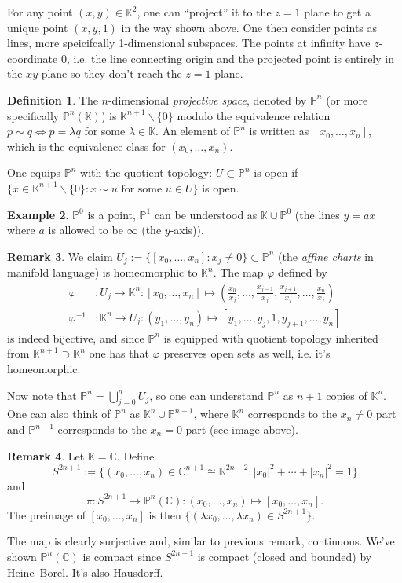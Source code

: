 \documentclass{article}
\newcommand{\R}{\mathbb{R}}
\newcommand{\C}{\mathbb{C}}
\newcommand{\K}{\mathbb{K}}
\newcommand{\p}{\mathbb{P}}
\theoremstyle{definition}
\newtheorem{defn}{Definition}[subsection]
\newtheorem{example}[defn]{Example}
\newtheorem{remark}[defn]{Remark}
\begin{document}
For any point $(x,y)\in\K^2$, one can ``project'' it to the $z=1$ plane to get a unique point $(x,y,1)$ in the way shown above. One then consider points as lines, more speicifcally 1-dimensional subspaces. The points at infinity have $z$-coordinate 0, i.e. the line connecting origin and the projected point is entirely in the $xy$-plane so they don't reach the $z=1$ plane.

\begin{defn}
The $n$-dimensional \textit{projective space}, denoted by $\p^n$ (or more specifically $\p^n(\K)$) is $\K^{n+1}\backslash\{0\}$ modulo the equivalence relation $p\sim q\iff p=\lambda q$ for some $\lambda\in\K$. An element of $\p^n$ is written as $[x_0,\ldots,x_n]$, which is the equivalence class for $(x_0,\ldots,x_n)$.

One equips $\p^n$ with the quotient topology: $U\subset\p^n$ is open if $\{x\in\K^{n+1}\backslash\{0\}:x\sim u\text{ for some }u\in U\}$ is open.
\end{defn}
\begin{example}
\label{example:understandPn}
$\p^0$ is a point, $\p^1$ can be understood as $\K\cup\p^0$ (the lines $y=ax$ where $a$ is allowed to be $\infty$ (the $y$-axis)).
\end{example}

\begin{remark}
\label{remark:charts}
We claim $U_j:=\{[x_0,\ldots,x_n]:x_j\neq 0\}\subset\p^n$ (the \textit{affine charts} in manifold language) is homeomorphic to $\K^n$. The map $\varphi$ defined by
\[
\begin{aligned}
\varphi&:U_j\rightarrow\K^n:[x_0,\ldots,x_n]\mapsto\left(\frac{x_0}{x_j},\ldots,\frac{x_{j-1}}{x_j},\frac{x_{j+1}}{x_j},\ldots,\frac{x_n}{x_j}\right) \\
\varphi^{-1}&:\K^n\rightarrow U_j:(y_1,\ldots,y_n)\mapsto [y_1,\ldots,y_j,1,y_{j+1},\ldots,y_n]
\end{aligned}
\]
is indeed bijective, and since $\p^n$ is equipped with quotient topology inherited from $\K^{n+1}\supset\K^n$ one has that $\varphi$ preserves open sets as well, i.e. it's homeomorphic.

Now note that $\p^n=\bigcup_{j=0}^n U_j$, so one can understand $\p^n$ as $n+1$ copies of $\K^n$. One can also think of $\p^n$ as $\K^n\cup\p^{n-1}$, where $\K^n$ corresponds to the $x_n\neq 0$ part and $\p^{n-1}$ corresponds to the $x_n=0$ part (see image above).
\end{remark}

\begin{remark}
\label{remark:PnCiscompact}
Let $\K=\C$. Define
\[
S^{2n+1}:=\{(x_0,\ldots,x_n)\in\C^{n+1}\cong\R^{2n+2}:|x_0|^2+\cdots+|x_n|^2=1\}
\]
and
\[
\pi:S^{2n+1}\rightarrow\p^n(\C):(x_0,\ldots,x_n)\mapsto [x_0,\ldots,x_n].
\]
The preimage of $[x_0,\ldots,x_n]$ is then $\{(\lambda x_0,\ldots,\lambda x_n) \in S^{2n+1}\}$.

The map is clearly surjective and, similar to previous remark, continuous. We've shown $\p^n(\C)$ is compact since $S^{2n+1}$ is compact (closed and bounded) by Heine--Borel. It's also Hausdorff.
\end{remark}
\end{document}
